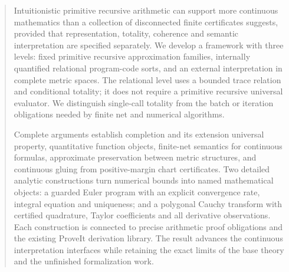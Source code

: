 \documentclass[11pt,a4paper]{article}
\theoremstyle{definition}
\theoremstyle{remark}
\begin{document}
\begin{abstract}
Intuitionistic primitive recursive arithmetic can support more continuous
mathematics than a collection of disconnected finite certificates suggests,
provided that representation, totality, coherence and semantic interpretation
are specified separately. We develop a framework with three levels: fixed
primitive recursive approximation families, internally quantified relational
program-code sorts, and an external interpretation in complete metric spaces.
The relational level uses a bounded trace relation and conditional totality;
it does not require a primitive recursive universal evaluator. We distinguish
single-call totality from the batch or iteration obligations needed by finite
net and numerical algorithms.

Complete arguments establish completion and its extension universal property,
quantitative function objects, finite-net semantics for continuous formulas,
approximate preservation between metric structures, and continuous gluing
from positive-margin chart certificates. Two detailed analytic constructions
turn numerical bounds into named mathematical objects: a guarded Euler program
with an explicit convergence rate, integral equation and uniqueness; and a
polygonal Cauchy transform with certified quadrature, Taylor coefficients and
all derivative observations. Each construction is connected to precise
arithmetic proof obligations and the existing ProveIt derivation library.
The result advances the continuous interpretation interfaces while retaining
the exact limits of the base theory and the unfinished formalization work.
\end{abstract}
\tableofcontents
\newpage






\clearpage

\end{document}
